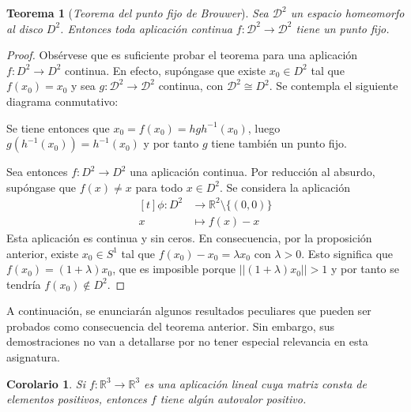 \documentclass[11pt]{report}
\newenvironment{ctheorem} %
  {\begin{mdframed}[innertopmargin = 0pt,
                    innerbottommargin = 7.5pt,
                    backgroundcolor = lightgray!10,
                    linewidth = 1pt,
                    shadow = true,
                    shadowsize = 5pt,
                    roundcorner = 0pt,
                    skipabove = 0pt]
    \begin{theorem}}
  {\end{theorem}\end{mdframed}}
\newtheorem{corollary}{Corolario}[chapter]
\newtheorem{theorem}{Teorema}[chapter]
\theoremstyle{definition}
\theoremstyle{definition}
\theoremstyle{remark}
\newcommand{\R}{\mathbb R}
\begin{document}
\begin{ctheorem}[\textit{Teorema del punto fijo de Brouwer}]
Sea $\mathcal{D}^2$ un espacio homeomorfo al disco $D^2$. Entonces toda aplicación continua $f \colon \mathcal{D}^2 \to \mathcal{D}^2$ tiene un punto fijo.
\end{ctheorem}

\begin{proof}
Obsérvese que es suficiente probar el teorema para una aplicación $f \colon D^2 \to D^2$ continua. En efecto, supóngase que existe $x_0 \in D^2$ tal que $f(x_0) = x_0$ y sea $g \colon \mathcal{D}^2 \to \mathcal{D}^2$ continua, con $\mathcal{D}^2 \cong D^2$. Se contempla el siguiente diagrama conmutativo:

\begin{center}
\end{center}
Se tiene entonces que $x_0 = f(x_0) = hgh^{-1}(x_0)$, luego $g(h^{-1}(x_0)) = h^{-1}(x_0)$ y por tanto $g$ tiene también un punto fijo.

\vspace{2mm}

Sea entonces $f \colon D^2 \to D^2$ una aplicación continua. Por reducción al absurdo, supóngase que $f(x)\neq x$ para todo $x \in D^2$. Se considera la aplicación
\[
\begin{aligned}[t]
\phi \colon D^2 &\longrightarrow \R^2 \setminus \{(0,0)\} \\
x &\longmapsto f(x)-x
\end{aligned}
\]
Esta aplicación es continua y sin ceros. En consecuencia, por la proposición anterior, existe $x_0 \in S^1$ tal que $f(x_0)-x_0 = \lambda x_0$ con $\lambda > 0$. Esto significa que $f(x_0) = (1+\lambda)x_0$, que es imposible porque $||(1+\lambda)x_0|| > 1$ y por tanto se tendría $f(x_0) \notin D^2$.
\end{proof}

A continuación, se enunciarán algunos resultados peculiares que pueden ser probados como consecuencia del teorema anterior. Sin embargo, sus demostraciones no van a detallarse por no tener especial relevancia en esta asignatura.

\begin{corollary}
Si $f \colon \R^3 \to \R^3$ es una aplicación lineal cuya matriz consta de elementos positivos, entonces $f$ tiene algún autovalor positivo.
\end{corollary}
\end{document}
